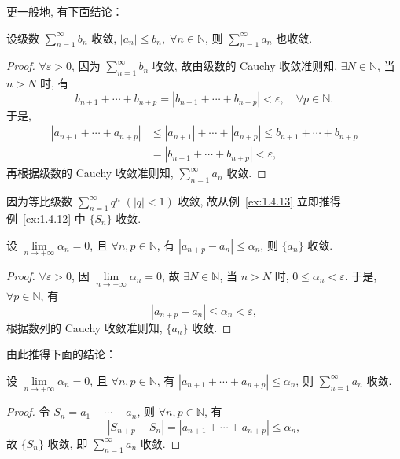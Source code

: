 更一般地, 有下面结论：

\begin{example}\label{ex:1.4.13}
设级数 $\sum\limits_{n=1}^{\infty} b_{n}$ 收敛, $|a_{n}| \leqslant b_{n},\;\forall n \in \mathbb{N}$, 则 $\sum\limits_{n=1}^{\infty} a_{n}$ 也收敛.
\end{example}

\begin{proof}
$\forall\varepsilon>0$, 因为 $\sum\limits_{n=1}^{\infty}b_{n}$ 收敛, 故由级数的 Cauchy 收敛准则知, $\exists N\in\mathbb{N}$, 当 $n>N$ 时, 有
\[
b_{n+1} + \cdots + b_{n+p} = |b_{n+1} + \cdots + b_{n+p}| < \varepsilon,\quad \forall p\in\mathbb{N}.
\]
于是,
\[
\begin{aligned}
|a_{n+1} + \cdots + a_{n+p}| &\leqslant |a_{n+1}| + \cdots + |a_{n+p}| \leqslant b_{n+1} + \cdots + b_{n+p} \\
&= |b_{n+1} + \cdots + b_{n+p}| < \varepsilon,
\end{aligned}
\]
再根据级数的 Cauchy 收敛准则知, $\sum\limits_{n=1}^{\infty}a_{n}$ 收敛.
\end{proof}

因为等比级数 $\sum\limits_{n=1}^{\infty} q^{n}\;(|q| < 1)$ 收敛, 故从例~\ref{ex:1.4.13} 立即推得例~\ref{ex:1.4.12} 中 $\{S_{n}\}$ 收敛.

\begin{example}\label{ex:1.4.14}
设 $\lim\limits_{n\to+\infty} \alpha_n = 0$, 且 $\forall n, p \in \mathbb{N}$, 有 $|a_{n+p} - a_n| \leqslant \alpha_n$, 则 $\{a_n\}$ 收敛.
\end{example}

\begin{proof}
$\forall\varepsilon>0$, 因 $\lim\limits_{n\to+\infty}\alpha_n = 0$, 故 $\exists N\in\mathbb{N}$, 当 $n>N$ 时, $0 \leqslant \alpha_n < \varepsilon$. 于是, $\forall p\in\mathbb{N}$, 有
\[
|a_{n+p} - a_{n}| \leqslant \alpha_{n} < \varepsilon,
\]
根据数列的 Cauchy 收敛准则知, $\{a_{n}\}$ 收敛.
\end{proof}

由此推得下面的结论：

\begin{example}\label{ex:1.4.15}
设 $\lim\limits_{n\to+\infty}\alpha_n = 0$, 且 $\forall n, p\in\mathbb{N}$, 有 $|a_{n+1} + \cdots + a_{n+p}| \leqslant \alpha_n$, 则 $\sum\limits_{n=1}^{\infty}a_n$ 收敛.
\end{example}

\begin{proof}
令 $S_{n} = a_{1} + \cdots + a_{n}$, 则 $\forall n, p\in\mathbb{N}$, 有
\[
|S_{n+p} - S_{n}| = |a_{n+1} + \cdots + a_{n+p}| \leqslant \alpha_{n},
\]
故 $\{S_{n}\}$ 收敛, 即 $\sum\limits_{n=1}^{\infty}a_{n}$ 收敛.
\end{proof}

